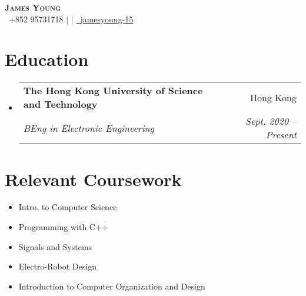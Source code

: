 \documentclass[letterpaper,12pt]{article}
\makeatletter
\newcommand{\resumeSubheading}[4]{
  \vspace{-2pt}\item
    \begin{tabular*}{0.97\textwidth}[t]{l@{\extracolsep{\fill}}r}
      \textbf{#1} & #2 \\
      \textit{\small#3} & \textit{\small #4} \\
    \end{tabular*}\vspace{-7pt}
}
\newcommand{\resumeSubHeadingListStart}{\begin{itemize}[leftmargin=0.15in, label={}]}
\newcommand{\resumeSubHeadingListEnd}{\end{itemize}}
\makeatother
\begin{document}
\begin{center}
    \textbf{\Huge \scshape James Young} \\ \vspace{2pt}
    \small  \faPhone\ {+852 95731718} $|$ 
    \href{mailto:jyyoungaa@connect.ust.hk}{} $|$ 
    \href{https://github.com/jamesyoung-15} {\faGithub\ {jamesyoung-15}}
\end{center}


\section{Education}
  \resumeSubHeadingListStart
    \resumeSubheading
      {The Hong Kong University of Science and Technology}{Hong Kong}
      {BEng in Electronic Engineering}{Sept. 2020 -- Present}
  \resumeSubHeadingListEnd

\section{Relevant Coursework}
\vspace{-12pt}
    \begin{multicols}{2}
        \begin{itemize}[itemsep=-2pt, parsep=5pt]
        \small
            \item Intro. to Computer Science
            \item Programming with C++
            \item Signals and Systems
            \item Electro-Robot Design
            \item Introduction to Computer Organization and Design
        \end{itemize}
    \end{multicols}


\end{document}
